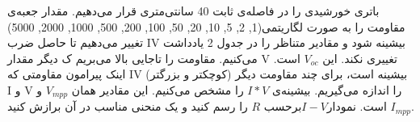 \documentclass{article}
\begin{document}
	
	باتری خورشیدی را در فاصله‌ی ثابت 40 سانتی‌متری قرار می‌دهیم. مقدار جعبه‌ی مقاومت را به صورت لگاریتمی(1, 2, 5, 10, 20, 50, 100, 200, 500, 1000, 2000, 5000) تغییر می‌دهیم تا حاصل ضرب IV بیشینه شود و مقادیر متناظر را در جدول 2 یادداشت می‌کنیم. مقاومت را تاجایی بالا می‌بریم ک دیگر مقدار V تغییری نکند. این $V_{oc}$ است. اینک پیرامون مقاومتی ‌که IV بیشینه است، برای چند مقاومت دیگر (کوچکتر و بزرگتر) I و V را اندازه می‌گیریم. بیشینه‌ی $I*V$ را مشخص می‌کنیم. این مقادیر همان $V_{mpp}$ و $I_{mpp}$ است. نمودار$I-V$برحسب $R$ را رسم کنید و یک منحنی مناسب در آن برازش کنید.
	
	
	
	\begin{latin}
		\vspace{3cm}
		\begin{center}
			\begin{table}[h!]
				\centering
				
				\setlength{\tabcolsep}{20pt}
				\renewcommand{\arraystretch}{2}
				

\end{table}
\end{center}
\end{latin}
\end{document}

